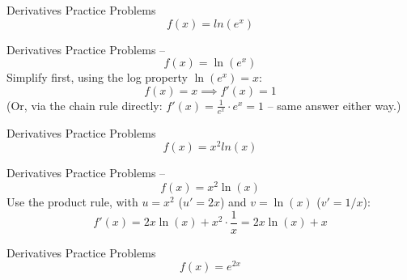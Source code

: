 \documentclass[aspectratio=169]{beamer}
\begin{document}
\begin{frame}{Derivatives Practice Problems}\label{main1}
	\vspace{-4cm}
     \[
    f(x) = ln(e^x)
    \]
\end{frame}

\begin{frame}{Derivatives Practice Problems -- }\label{main1}
	\vspace{-1cm}
     \[
    f(x) = \ln(e^x)
    \]
    \vspace{0.5em}
    Simplify first, using the log property $\ln(e^x) = x$:
    \[
    f(x) = x \implies f'(x) = 1
    \]
    \vspace{0.5em}
    (Or, via the chain rule directly: $f'(x) = \frac{1}{e^x} \cdot e^x = 1$ -- same answer either way.)
\end{frame}

\begin{frame}{Derivatives Practice Problems}\label{main1}
	\vspace{-4cm}
     \[
    f(x) = x^{2}ln(x)
    \]
\end{frame}

\begin{frame}{Derivatives Practice Problems -- }\label{main1}
	\vspace{-1cm}
     \[
    f(x) = x^{2}\ln(x)
    \]
    \vspace{0.5em}
    Use the product rule, with $u=x^2$ ($u'=2x$) and $v=\ln(x)$ ($v'=1/x$):
    \[
    f'(x) = 2x\ln(x) + x^2 \cdot \frac{1}{x} = 2x\ln(x) + x
    \]
\end{frame}

\begin{frame}{Derivatives Practice Problems}\label{main1}
	\vspace{-4cm}
     \[
    f(x) = e^{2x}
    \]
\end{frame}
\end{document}
